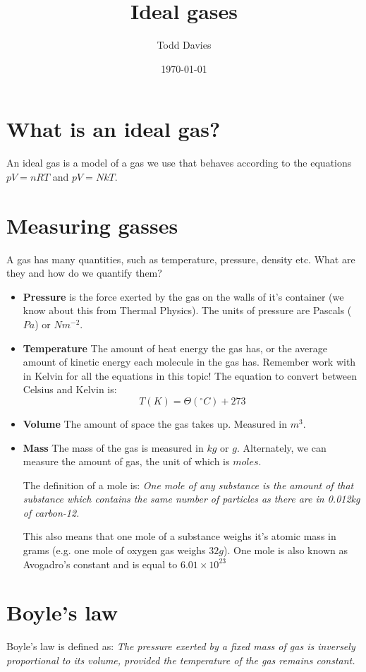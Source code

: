 \documentclass{article}
\title{Ideal gases}
\author{Todd Davies}
\date{\today}
\begin{document}
\lhead{\today}

\maketitle

\section*{What is an ideal gas?}
\thispagestyle{empty}
An ideal gas is a model of a gas we use that behaves according to the equations $pV = nRT$ and $pV = NkT$.

\section*{Measuring gasses}
A gas has many quantities, such as temperature, pressure, density etc. What are they and how do we quantify them?

\begin{itemize}
	\item \textbf{Pressure} is the force exerted by the gas on the walls of it's container (we know about this from Thermal Physics). The units of pressure are Pascals ($Pa$) or $Nm^{-2}$.
	\item \textbf{Temperature} The amount of heat energy the gas has, or the average amount of kinetic energy each molecule in the gas has. Remember work with in Kelvin for all the equations in this topic! The equation to convert between Celsius and Kelvin is: 
	\[
		T(K) = \Theta(^\circ C) + 273
	\]
	\item \textbf{Volume} The amount of space the gas takes up. Measured in $m^3$.
	\item \textbf{Mass} The mass of the gas is measured in $kg$ or $g$. Alternately, we can measure the amount of gas, the unit of which is $moles$.
	
	The definition of a mole is: \textit{One mole of any substance is the amount of that substance which contains the same number of particles as there are in 0.012kg of carbon-12.}
	
	This also means that one mole of a substance weighs it's atomic mass in grams (e.g. one mole of oxygen gas weighs $32g$). One mole is also known as Avogadro's constant and is equal to $6.01 \times 10^{23}$
\end{itemize}

\section*{Boyle's law}
Boyle's law is defined as: \textit{The pressure exerted by a fixed mass of gas is inversely proportional to its volume, provided the temperature of the gas remains constant.}
\end{document}
